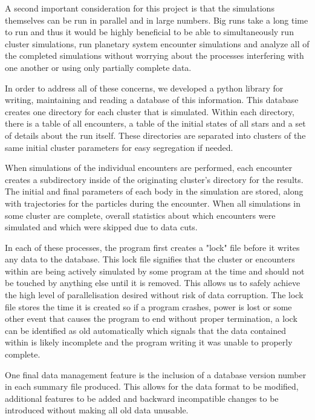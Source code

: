 \documentclass[12pt]{article}
\begin{document}
    A second important consideration for this project is that the simulations themselves
    can be run in parallel and in large numbers. Big runs take a long time to run
    and thus it would be highly beneficial to be able to simultaneously run cluster
    simulations, run planetary system encounter simulations and analyze all of the
    completed simulations without worrying about the processes interfering with one
    another or using only partially complete data.

    In order to address all of these concerns, we developed a python library 
    for writing, maintaining and reading a database of this information. This database
    creates one directory for each cluster that is simulated. Within each directory,
    there is a table of all encounters, a table of the initial states of all stars
    and a set of details about the run itself. These directories are separated
    into clusters of the same initial cluster parameters for easy segregation if needed.

    When simulations of the individual encounters are performed, each encounter
    creates a subdirectory inside of the originating cluster's directory for the 
    results. 
    The initial and final parameters of each body in the simulation are stored, along
    with trajectories for the particles during the encounter. When all simulations
    in some cluster are complete, overall statistics about which encounters were
    simulated and which were skipped due to data cuts.

    In each of these processes, the program first creates a "lock" file before it
    writes any data to the database. This lock file signifies that the cluster or
    encounters within are being actively simulated by some program at the time and
    should not be touched by anything else until it is removed. This allows us to
    safely achieve the high level of parallelisation desired without risk of data
    corruption. The lock file stores the time it is created so if a program
    crashes, power is lost or some other event that causes the program to end without
    proper termination, a lock can be identified as old automatically which 
    signals that the data contained within is likely incomplete and the program
    writing it was unable to properly complete.

    One final data management feature is the inclusion of a database version number
    in each summary file produced. This allows for the data format to be modified,
    additional features to be added and backward incompatible changes to be introduced
    without making all old data unusable. 
\end{document}
